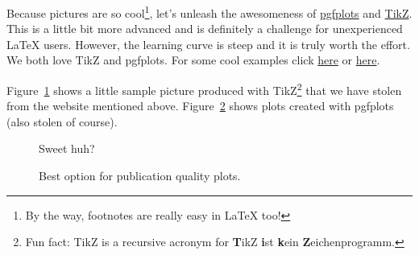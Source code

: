 \documentclass[12pt, a4paper]{article}
\begin{document}
Because pictures are so cool\footnote{By the way, footnotes are really easy in
\LaTeX{} too!}, let's unleash the awesomeness of
\href{http://www.ctan.org/pkg/pgfplots}{pgfplots} and
\href{http://www.ctan.org/pkg/pgf}{TikZ}. This is a little bit more advanced and
is definitely a challenge for unexperienced \LaTeX{} users. However, the
learning curve is steep and it is truly worth the effort. We both love TikZ and
pgfplots.  For some cool examples click
\href{http://www.texample.net/tikz/examples/all/}{here} or
\href{http://pgfplots.sourceforge.net/gallery.html}{here}.

Figure~\ref{fig:tikz} shows a little sample picture produced with
TikZ\footnote{Fun fact: TikZ is a recursive acronym for \textbf{T}ikZ
\textbf{i}st \textbf{k}ein \textbf{Z}eichenprogramm.} that we have stolen from
the website mentioned above. Figure~\ref{fig:plot} shows plots created with
pgfplots (also stolen of course).

\begin{figure}
  \begin{center}
  \end{center}
  \caption{Sweet huh?\label{fig:tikz}}
\end{figure}

\begin{figure}
  \begin{center}
  \hfill
  \end{center}
  \caption{Best option for publication quality plots.\label{fig:plot}}
\end{figure}
\end{document}
